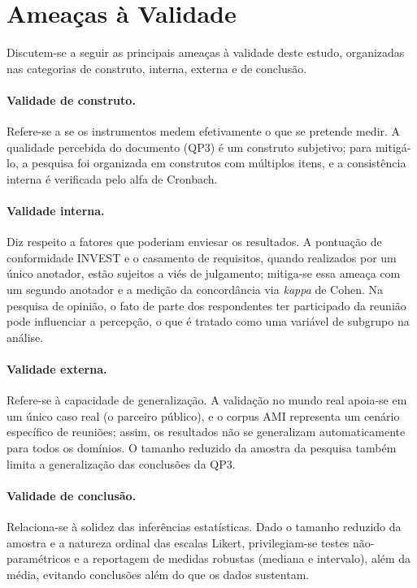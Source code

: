 \section{Ameaças à Validade}
\label{sec:ameacas}

Discutem-se a seguir as principais ameaças à validade deste estudo, organizadas nas categorias de construto, interna, externa e de conclusão.

\paragraph{Validade de construto.}
Refere-se a se os instrumentos medem efetivamente o que se pretende medir. A qualidade percebida do documento (QP3) é um construto subjetivo; para mitigá-lo, a pesquisa foi organizada em construtos com múltiplos itens, e a consistência interna é verificada pelo alfa de Cronbach.

\paragraph{Validade interna.}
Diz respeito a fatores que poderiam enviesar os resultados. A pontuação de conformidade INVEST e o casamento de requisitos, quando realizados por um único anotador, estão sujeitos a viés de julgamento; mitiga-se essa ameaça com um segundo anotador e a medição da concordância via \textit{kappa} de Cohen. Na pesquisa de opinião, o fato de parte dos respondentes ter participado da reunião pode influenciar a percepção, o que é tratado como uma variável de subgrupo na análise.

\paragraph{Validade externa.}
Refere-se à capacidade de generalização. A validação no mundo real apoia-se em um único caso real (o parceiro público), e o corpus AMI representa um cenário específico de reuniões; assim, os resultados não se generalizam automaticamente para todos os domínios. O tamanho reduzido da amostra da pesquisa também limita a generalização das conclusões da QP3.

\paragraph{Validade de conclusão.}
Relaciona-se à solidez das inferências estatísticas. Dado o tamanho reduzido da amostra e a natureza ordinal das escalas Likert, privilegiam-se testes não-paramétricos e a reportagem de medidas robustas (mediana e intervalo), além da média, evitando conclusões além do que os dados sustentam.
